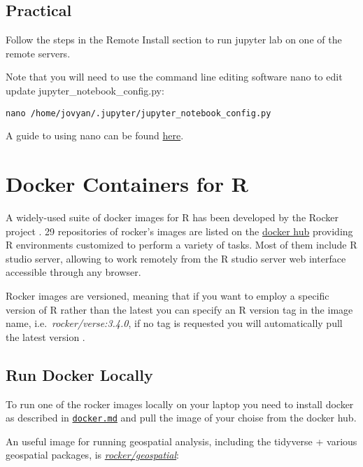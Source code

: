 \documentclass[
]{book}
\begin{document}
\hypertarget{practical}{%
\section{Practical}\label{practical}}

Follow the steps in the Remote Install section to run jupyter lab on one of the remote servers.

Note that you will need to use the command line editing software nano to edit update jupyter\_notebook\_config.py:

\begin{verbatim}
nano /home/jovyan/.jupyter/jupyter_notebook_config.py
\end{verbatim}

A guide to using nano can be found \href{https://www.howtogeek.com/howto/42980/the-beginners-guide-to-nano-the-linux-command-line-text-editor/}{here}.

\hypertarget{docker-containers-for-r}{%
\chapter{Docker Containers for R}\label{docker-containers-for-r}}

A widely-used suite of docker images for R has been developed by the Rocker project \citep{RJ-2017-065}. 29 repositories of rocker's images are listed on the \href{https://hub.docker.com/u/rocker/}{docker hub} providing R environments customized to perform a variety of tasks. Most of them include R studio server, allowing to work remotely from the R studio server web interface accessible through any browser.

Rocker images are versioned, meaning that if you want to employ a specific version of R rather than the latest you can specify an R version tag in the image name, i.e.~\emph{rocker/verse:3.4.0}, if no tag is requested you will automatically pull the latest version \citep{RJ-2017-065}.

\hypertarget{run-docker-locally}{%
\section{Run Docker Locally}\label{run-docker-locally}}

To run one of the rocker images locally on your laptop you need to install docker as described in \href{06_docker.md}{\texttt{docker.md}} and pull the image of your choise from the docker hub.

An useful image for running geospatial analysis, including the tidyverse + various geospatial packages, is \href{https://hub.docker.com/r/rocker/geospatial}{\emph{rocker/geospatial}}:
\end{document}
